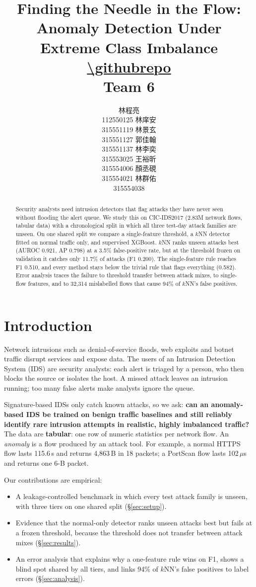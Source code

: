 \documentclass[11pt]{article}
\title{
    Finding the Needle in the Flow: \\
    Anomaly Detection Under Extreme Class Imbalance
    \vspace{0.3em}
    {\footnotesize
    \url{\githubrepo}}\\
    \vspace{0.2em}
    \small{Team 6}
}
\author{
  林程亮 \\ \small 112550125
  \And
  林庠安 \\ \small 315551119
  \And
  林景玄 \\ \small 315551127
  \And
  郭佳翰 \\ \small 315551137
  \AND
  林李奕 \\ \small 315553025
  \And
  王裕昕 \\ \small 315554006
  \And
  顏丞硯 \\ \small 315554021
  \And
  林群佑 \\ \small 315554038
}
\begin{document}
\maketitle
\begin{abstract}
Security analysts need intrusion detectors that flag attacks they have never seen without flooding the alert queue. We study this on CIC-IDS2017 (2.83M network flows, tabular data) with a chronological split in which all three test-day attack families are unseen. On one shared split we compare a single-feature threshold, a $k$NN detector fitted on normal traffic only, and supervised XGBoost. $k$NN ranks unseen attacks best (AUROC 0.921, AP 0.798) at a 3.5\% false-positive rate, but at the threshold frozen on validation it catches only 11.7\% of attacks (F1 0.200). The single-feature rule reaches F1 0.510, and every method stays below the trivial rule that flags everything (0.582). Error analysis traces the failure to threshold transfer between attack mixes, to single-flow features, and to 32,314 mislabelled flows that cause 94\% of $k$NN's false positives.
\end{abstract}


\section{Introduction}
\label{sec:introduction}

Network intrusions such as denial-of-service floods, web exploits and botnet traffic disrupt services and expose data. The users of an Intrusion Detection System (IDS) are security analysts: each alert is triaged by a person, who then blocks the source or isolates the host. A missed attack leaves an intrusion running; too many false alerts make analysts ignore the queue.

Signature-based IDSs only catch known attacks, so we ask: \textbf{can an anomaly-based IDS be trained on benign traffic baselines and still reliably identify rare intrusion attempts in realistic, highly imbalanced traffic?} The data are \textbf{tabular}: one row of numeric statistics per network flow. An \emph{anomaly} is a flow produced by an attack tool. For example, a normal HTTPS flow lasts 115.6\,s and returns 4,863\,B in 18 packets; a PortScan flow lasts 102\,$\mu$s and returns one 6-B packet.

Our contributions are empirical:
\begin{itemize}
\setlength{\itemsep}{0em}
\item A leakage-controlled benchmark in which every test attack family is unseen, with three tiers on one shared split (\S\ref{sec:setup}).
\item Evidence that the normal-only detector ranks unseen attacks best but fails at a frozen threshold, because the threshold does not transfer between attack mixes (\S\ref{sec:results}).
\item An error analysis that explains why a one-feature rule wins on F1, shows a blind spot shared by all tiers, and links 94\% of $k$NN's false positives to label errors (\S\ref{sec:analysis}).
\end{itemize}
\end{document}
